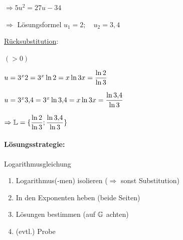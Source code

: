\begin{enumerate}
	$\Rightarrow 5u^2=27u-34$
	
	$\Rightarrow$ Lösungsformel $u_1=2;\quad u_2=3{,}4$
	
	\ul{Rücksubstitution}:
	
	$(>0)$
	
	$u=3^x\\
	2=3^x\\
	\ln2=x\ln3\\
	x=\dfrac{\ln2}{\ln3}$
	
	
	$u=3^x\\
	3{,}4=3^x\\
	\ln3{,}4=x\ln3\\
	x=\dfrac{\ln3{,}4}{\ln3}$
	
	$\Rightarrow \mathbb{L}=\{\dfrac{\ln2}{\ln3};\dfrac{\ln3{,}4}{\ln3}\}$
\end{enumerate}

\clearpage
\paragraph{Lösungsstrategie:} Logarithmusgleichung
\begin{enumerate}
	\item Logarithmus(-men) isolieren ($\Rightarrow$ sonst Substitution)
	\item In den Exponenten heben (beide Seiten)
	\item Lösungen bestimmen (auf $\mathbb{G}$ achten)
	\item (evtl.) Probe
\end{enumerate}


